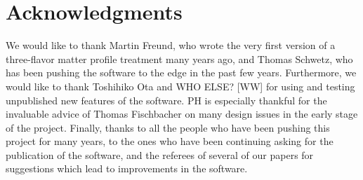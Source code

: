 \documentclass[a4paper,12pt,twoside]{book}
\newcommand{\AEDL}{{\sf AEDL}}
\begin{document}
%

\mainmatter







\backmatter
\chapter*{Acknowledgments}

We would like to thank Martin Freund, who wrote the very first
version of a three-flavor matter profile treatment many years ago,
and Thomas Schwetz, who has been pushing the software to the edge in the 
past few years. Furthermore, we would like to thank Toshihiko Ota and WHO ELSE? [WW]
for using and testing unpublished new features of the software.
PH is especially thankful for the invaluable advice of Thomas Fischbacher on
many design issues in the early stage of the project.
Finally, thanks to all the people who have been pushing this project
for many years, to the ones who have been continuing asking for the
publication of the software, and the referees of several of our
papers for suggestions which lead to improvements in the software.
\end{document}
